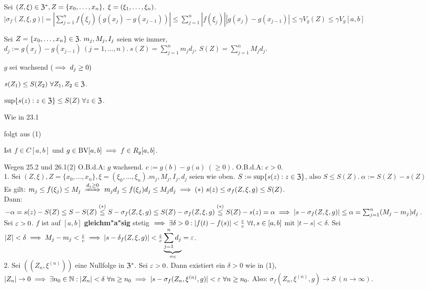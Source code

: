 \documentclass[a4paper,twoside,DIV15,BCOR12mm]{scrbook}
\begin{document}
\begin{beweis}
Sei $(Z, \xi) \in \mathfrak{Z}^*, Z = \{x_0,\ldots,x_n\},\ \xi = (\xi_1,\ldots,\xi_n)$.\\
$|\sigma_f(Z,\xi, g)|=|\displaystyle\sum_{j=1}^nf(\xi_j)(g(x_j)-g(x_{j-1}))|\le\displaystyle\sum_{j=1}^n|f(\xi_j)||g(x_j)-g(x_{j-1})|\le\gamma V_g(Z)\le\gamma V_g[a, b]$ 
\end{beweis}

\begin{bezeichnungen}
Sei $Z=\{x_0, \ldots, x_n\} \in \mathfrak{Z}.\ m_j, M_j, I_j$ seien wie immer, $d_j:=g(x_j)-g(x_{j-1})\ (j=1,\ldots,n).\ s(Z)=\sum_{j=1}^nm_jd_j,\ S(Z)=\sum_{j=1}^nM_jd_j$.
\end{bezeichnungen}

\begin{wichtigerhilfssatz}
$g$ sei wachsend $(\implies d_j \ge 0)$
\begin{liste}
\item $s(Z_1)\le S(Z_2)\ \forall Z_1, Z_2 \in \mathfrak{Z}$.
\item $\sup \{s(z) : z \in \mathfrak{Z}\}\le S(Z)\ \forall z \in \mathfrak{Z}$.
\end{liste}
\end{wichtigerhilfssatz}

\begin{beweise}
\item Wie in 23.1
\item folgt aus (1)
\end{beweise}

\begin{satz}
Ist $f\in C[a,b]$ und $g \in \text{BV}[a,b]\implies f \in R_g[a,b]$.
\end{satz}

\begin{beweis}
Wegen 25.2 und 26.1(2) O.B.d.A: $g$ wachsend. $c:=g(b)-g(a)\ (\ge 0).$ O.B.d.A: $c>0$.\\
1. Sei $(Z, \xi), Z=\{x_0, \ldots, x_n\}, \xi=(\xi_0, \ldots, \xi_n). m_j, M_j, I_j, d_j$ seien wie oben. $S:=\sup\{s(z): z \in \mathfrak{Z}\}$, also $S\le S(Z).\ \alpha:=S(Z)-s(Z)$\\
Es gilt: $m_j\le f(\xi_j) \le M_j \folgtwegen{d_j \ge 0} m_jd_j \le f(\xi_j)d_j\le M_jd_j\folgt (*)\ s(z)\le \sigma_f(Z,\xi,g)\le S(Z)$.\\
Dann: $-\alpha=s(z)-S(Z)\le S-S(Z)\overset{(*)}{\le}S-\sigma_f(Z,\xi,g)\le S(Z)-\sigma_f(Z,\xi,g)\overset{(*)}{\le}S(Z)-s(z)=\alpha\implies |s-\sigma_f(Z,\xi,g)|\le \alpha = \sum_{j=1}^n(M_j-m_j)d_j$.\\
Sei $\varepsilon>0$. $f$ ist auf $[a,b]$ \textbf{gleichm"a"sig} stetig $\implies \exists\delta>0: |f(t)-f(s)|<\frac{\varepsilon}{c}\ \forall t,s \in [a,b]$ mit $|t-s|<\delta$. Sei $|Z|<\delta\implies M_j-m_j<\frac{\varepsilon}{c}\implies|s-\delta_f(Z,\xi, g)|<\frac{\varepsilon}{c}\underbrace{\sum_{j=1}^nd_j}_{=c}=\varepsilon$. \\
2. Sei $((Z_n, \xi^{(n)}))$ eine Nullfolge in $\mathfrak{Z}^*$. Sei $\varepsilon>0$. Dann existiert ein $\delta>0$ wie in (1), $|Z_n|\to 0 \implies \exists n_0 \in \mathbb{N}: |Z_n|<\delta\ \forall n\ge n_0 \implies |s-\sigma_f(Z_n, \xi^{(n)}, g)|<\varepsilon \ \forall n\ge n_0. $ Also: $\sigma_f(Z_n, \xi^{(n)}, g) \to S\ (n\to\infty)$.
\end{beweis}
\end{document}
